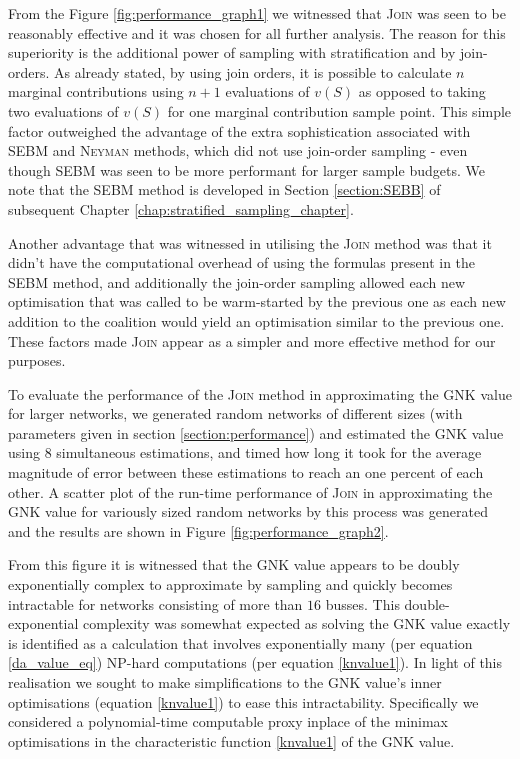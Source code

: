 From the Figure \ref{fig:performance_graph1} we witnessed that \textsc{Join} was seen to be reasonably effective and it was chosen for all further analysis.
The reason for this superiority is the additional power of sampling with stratification and by join-orders.
As already stated, by using join orders, it is possible to calculate $n$ marginal contributions using $n+1$ evaluations of $v(S)$ as opposed to taking two evaluations of $v(S)$ for one marginal contribution sample point.
This simple factor outweighed the advantage of the extra sophistication associated with \textsc{SEBM} and \textsc{Neyman} methods, which did not use join-order sampling - even though SEBM was seen to be more performant for larger sample budgets.
We note that the \textsc{SEBM} method is developed in Section \ref{section:SEBB} of subsequent Chapter \ref{chap:stratified_sampling_chapter}.

Another advantage that was witnessed in utilising the \textsc{Join} method was that it didn't have the computational overhead of using the formulas present in the \textsc{SEBM} method, and additionally the join-order sampling allowed each new optimisation that was called to be warm-started by the previous one as each new addition to the coalition would yield an optimisation similar to the previous one.
These factors made \textsc{Join} appear as a simpler and more effective method for our purposes.

To evaluate the performance of the \textsc{Join} method in approximating the GNK value for larger networks, we generated random networks of different sizes (with parameters given in section \ref{section:performance}) and estimated the GNK value using 8 simultaneous estimations, and timed how long it took for the average magnitude of error between these estimations to reach an one percent of each other.
A scatter plot of the run-time performance of \textsc{Join} in approximating the GNK value for variously sized random networks by this process was generated and the results are shown in Figure \ref{fig:performance_graph2}.


From this figure it is witnessed that the GNK value appears to be doubly exponentially complex to approximate by sampling and quickly becomes intractable for networks consisting of more than $16$ busses.
This double-exponential complexity was somewhat expected as solving the GNK value exactly is identified as a calculation that involves exponentially many (per equation \ref{da_value_eq}) NP-hard computations (per equation \ref{knvalue1}).
In light of this realisation we sought to make simplifications to the GNK value's inner optimisations (equation \ref{knvalue1}) to ease this intractability.
Specifically we considered a polynomial-time computable proxy inplace of the minimax optimisations in the characteristic function \eqref{knvalue1} of the GNK value.


